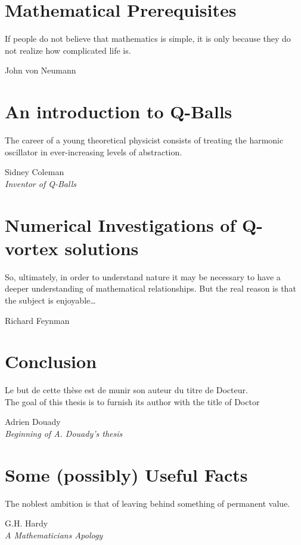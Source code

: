 \documentclass[12pt]{report}
\theoremstyle{definition}
\begin{document}
\chapter{Mathematical Prerequisites}\label{chap:prereqs}
\epigraph{If people do not believe that mathematics is simple, it is only
because they do not realize how complicated life is.}{John von Neumann}


\chapter{An introduction to Q-Balls}\label{chap:qballs}
\epigraph{The career of a young theoretical physicist consists of treating the
harmonic oscillator in ever-increasing levels of abstraction.}{Sidney Coleman\\\textit{Inventor of Q-Balls}}


\chapter{Numerical Investigations of Q-vortex solutions}\label{chap:numerics}
\epigraph{So, ultimately, in order to understand nature it may be necessary to
have a deeper understanding of mathematical relationships. But the real reason
is that the subject is enjoyable\ldots}{Richard Feynman}


\chapter{Conclusion}\label{chap:conclusion}
\epigraph{Le but de cette thèse est de munir son auteur du titre de Docteur.\\
The goal of this thesis is to furnish its author with the title of Doctor}{Adrien Douady\\\textit{Beginning of A. Douady's thesis}}


\appendix
\chapter{Some (possibly) Useful Facts}\label{chap:appendix}
\epigraph{The noblest ambition is that of leaving behind something of permanent
value.}{G.H. Hardy\\\textit{A Mathematicians Apology}}




\end{document}

